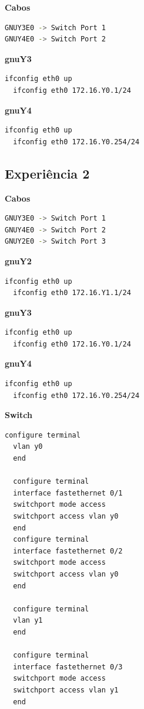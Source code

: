 \documentclass[article, a4paper, 11pt, oneside]{memoir}
\begin{document}
\textbf{Cabos}
\begin{lstlisting}[language=bash]
GNUY3E0 -> Switch Port 1
GNUY4E0 -> Switch Port 2
\end{lstlisting}

\textbf{gnuY3}
\begin{lstlisting}[language=bash]
  ifconfig eth0 up
  ifconfig eth0 172.16.Y0.1/24
\end{lstlisting}

\textbf{gnuY4}
\begin{lstlisting}[language=bash]
  ifconfig eth0 up
  ifconfig eth0 172.16.Y0.254/24
\end{lstlisting}

\subsection{Experiência 2} \label{exp2-conf}

\textbf{Cabos}
\begin{lstlisting}[language=bash]
GNUY3E0 -> Switch Port 1
GNUY4E0 -> Switch Port 2
GNUY2E0 -> Switch Port 3
\end{lstlisting}

\textbf{gnuY2}
\begin{lstlisting}[language=bash]
  ifconfig eth0 up
  ifconfig eth0 172.16.Y1.1/24
\end{lstlisting}

\textbf{gnuY3}
\begin{lstlisting}[language=bash]
  ifconfig eth0 up
  ifconfig eth0 172.16.Y0.1/24
\end{lstlisting}

\textbf{gnuY4}
\begin{lstlisting}[language=bash]
  ifconfig eth0 up
  ifconfig eth0 172.16.Y0.254/24
\end{lstlisting}

\textbf{Switch}
\begin{lstlisting}[language=bash]
  configure terminal
  vlan y0
  end

  configure terminal
  interface fastethernet 0/1
  switchport mode access
  switchport access vlan y0
  end
  configure terminal
  interface fastethernet 0/2
  switchport mode access
  switchport access vlan y0
  end

  configure terminal
  vlan y1 
  end 

  configure terminal
  interface fastethernet 0/3
  switchport mode access
  switchport access vlan y1
  end
\end{lstlisting}
\end{document}
